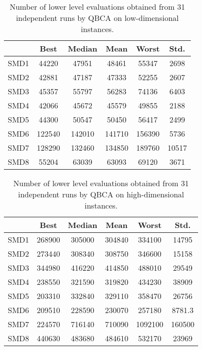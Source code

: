 \documentclass[conference]{IEEEtran}
\theoremstyle{definition}
\begin{document}
\begin{table}[htbp]
    \caption{Number of lower level evaluations obtained from 31 independent runs
             by QBCA on low-dimensional instances.}
    \label{tab:ll-evals-5}
    \centering
    \begin{tabular}{cccccc}
        \hline
            & Best &  Median &  Mean &  Worst &  Std. \\ \hline
        SMD1 & 44220 & 47951 & 48461 & 55347 & 2698 \\ \hline 
        SMD2 & 42881 & 47187 & 47333 & 52255 & 2607 \\ \hline 
        SMD3 & 45357 & 55797 & 56283 & 74136 & 6403 \\ \hline 
        SMD4 & 42066 & 45672 & 45579 & 49855 & 2188 \\ \hline 
        SMD5 & 44300 & 50547 & 50450 & 56417 & 2499 \\ \hline 
        SMD6 & 122540 & 142010 & 141710 & 156390 & 5736 \\ \hline 
        SMD7 & 128290 & 132460 & 134850 & 189760 & 10517 \\ \hline 
        SMD8 & 55204 & 63039 & 63093 & 69120 & 3671 \\ \hline 
    \end{tabular}
\end{table}
\begin{table}[htbp]
    \caption{Number of lower level evaluations obtained from 31 independent runs
             by QBCA on high-dimensional instances.}
    \label{tab:ll-evals}
    \centering
    \begin{tabular}{cccccc}
        \hline
        & Best &  Median &  Mean &  Worst &  Std. \\ \hline
        SMD1 & 268900 & 305000 & 304840 & 334100 & 14795 \\ \hline 
        SMD2 & 273440 & 308340 & 308750 & 346600 & 15158 \\ \hline 
        SMD3 & 344980 & 416220 & 414850 & 488010 & 29549 \\ \hline 
        SMD4 & 238550 & 321590 & 319820 & 434230 & 38909 \\ \hline 
        SMD5 & 203310 & 332840 & 329110 & 358470 & 26756 \\ \hline 
        SMD6 & 209510 & 228590 & 230070 & 257180 & 8781.3 \\ \hline 
        SMD7 & 224570 & 716140 & 710090 & 1092100 & 160500 \\ \hline 
        SMD8 & 440630 & 483680 & 484610 & 532170 & 23969 \\ \hline 
    \end{tabular}
\end{table}
\end{document}
